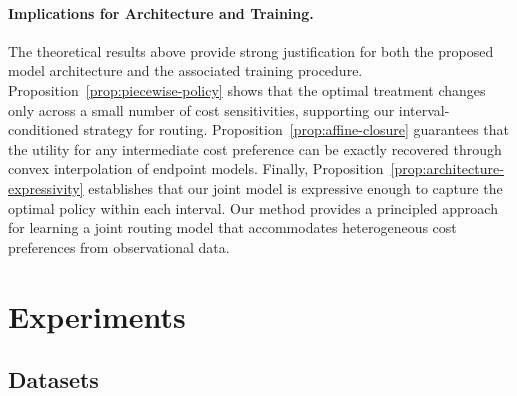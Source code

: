\documentclass{article}
\theoremstyle{remark}
\begin{document}


\paragraph{Implications for Architecture and Training.}
The theoretical results above provide strong justification for both the proposed model architecture and the associated training procedure. Proposition~\ref{prop:piecewise-policy} shows that the optimal treatment changes only across a small number of cost sensitivities, supporting our interval-conditioned strategy for routing. Proposition~\ref{prop:affine-closure} guarantees that the utility for any intermediate cost preference can be exactly recovered through convex interpolation of endpoint models. Finally, Proposition~\ref{prop:architecture-expressivity} establishes that our joint model  is expressive enough to capture the optimal policy within each interval. 
Our method provides a principled approach for learning a joint routing model that accommodates heterogeneous cost preferences from observational data.


\section{Experiments}\label{sec:exp}



\subsection{Datasets}
\end{document}
